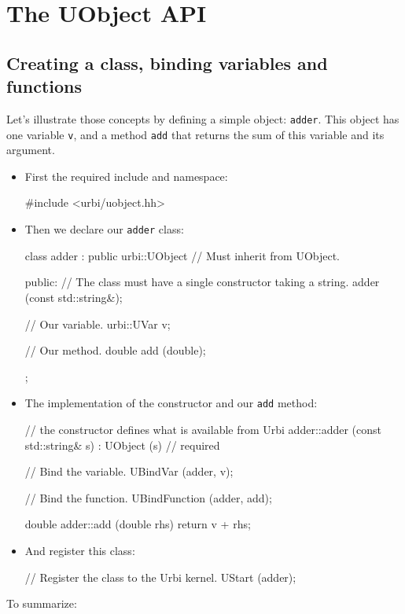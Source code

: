\chapter{The UObject API}
\label{sec:uob:api}

\section{Creating a class, binding variables and functions}

Let's illustrate those concepts by defining a simple object:
\lstinline{adder}. This object has one variable \lstinline{v}, and a
method \lstinline{add} that returns the sum of this variable and its
argument.

\begin{itemize}
\item First the required include and namespace:

\begin{cxx}
#include <urbi/uobject.hh>
\end{cxx}

\item Then we declare our \lstinline{adder} class:
\begin{cxx}
class adder : public urbi::UObject // Must inherit from UObject.
{
  public:
   // The class must have a single constructor taking a string.
   adder (const std::string&);

   // Our variable.
   urbi::UVar v;

   // Our method.
   double add (double);
};
\end{cxx}
\item The implementation of the constructor and our \lstinline{add}
  method:
\begin{cxx}
// the constructor defines what is available from Urbi
adder::adder (const std::string& s)
  : UObject (s) // required
{
  // Bind the variable.
  UBindVar (adder, v);

  // Bind the function.
  UBindFunction (adder, add);
}

double
adder::add (double rhs)
{
  return v + rhs;
}
\end{cxx}
\item And register this class:
\begin{cxx}
// Register the class to the Urbi kernel.
UStart (adder);
\end{cxx}
\end{itemize}

To summarize:

